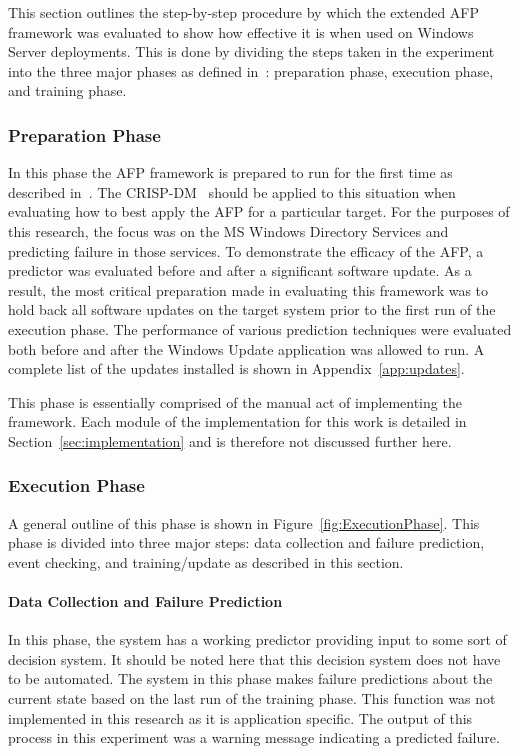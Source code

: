 This section outlines the step-by-step procedure by which the extended \ac{AFP}
framework was evaluated to show how effective it is when used on Windows Server
deployments.  This is done by dividing the steps taken in the experiment into
the three major phases as defined in~\cite{irrera2015}: preparation phase,
execution phase, and training phase.

\subsubsection{Preparation Phase}
In this phase the \ac{AFP} framework is prepared to run for the first time as
described in~\cite{irrera2015}.  The \ac{CRISP-DM}~\cite{crispdm} should be
applied to this situation when evaluating how to best apply the \ac{AFP} for a
particular target.  For the purposes of this research, the focus was on the
\ac{MS} Windows Directory Services and predicting failure in those services.
To demonstrate the efficacy of the \ac{AFP}, a predictor was evaluated before
and after a significant software update.  As a result, the most critical
preparation made in evaluating this framework was to hold back all software
updates on the target system prior to the first run of the execution phase.
The performance of various prediction techniques were evaluated both before and
after the Windows Update application was allowed to run.  A complete list of
the updates installed is shown in Appendix~\ref{app:updates}.

This phase is essentially comprised of the manual act of implementing the
framework.  Each module of the implementation for this work is detailed in
Section~\ref{sec:implementation} and is therefore not discussed further here.  

\subsubsection{Execution Phase}
A general outline of this phase is shown in Figure~\ref{fig:ExecutionPhase}.
This phase is divided into three major steps: data collection and failure
prediction, event checking, and training/update as described in this section.

\figExecutionPhase{2.5in}

\paragraph{Data Collection and Failure Prediction}
In this phase, the system has a working predictor providing input to some sort
of decision system.  It should be noted here that this decision system does not
have to be automated.  The system in this phase makes failure predictions about
the current state based on the last run of the training phase.  This function
was not implemented in this research as it is application specific.  The output
of this process in this experiment was a warning message indicating a predicted
failure.

